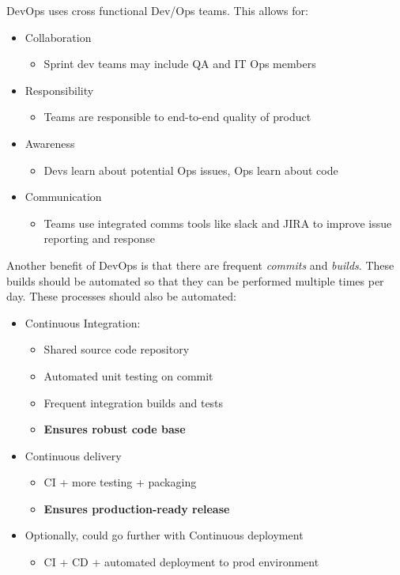 \documentclass[11pt,a4paper,titlepage,dvipsnames,cmyk]{scrartcl}
\begin{document}
DevOps uses cross functional Dev/Ops teams. This allows for:
\begin{itemize}
    \item Collaboration
    \begin{itemize}
        \item Sprint dev teams may include QA and IT Ops members
    \end{itemize}
    \item Responsibility
    \begin{itemize}
        \item Teams are responsible to end-to-end quality of product
    \end{itemize}
    \item Awareness
    \begin{itemize}
        \item Devs learn about potential Ops issues, Ops learn about code
    \end{itemize}
    \item Communication
    \begin{itemize}
        \item Teams use integrated comms tools like slack and JIRA to improve issue reporting and response
    \end{itemize}
\end{itemize}

Another benefit of DevOps is that there are frequent \textit{commits} and \textit{builds}. These builds should be automated so that they can be performed multiple times per day. These processes should also be automated:
\begin{itemize}
    \item Continuous Integration:
    \begin{itemize}
        \item Shared source code repository
        \item Automated unit testing on commit
        \item Frequent integration builds and tests
        \item \textbf{Ensures robust code base}
    \end{itemize}
    \item Continuous delivery
    \begin{itemize}
        \item CI + more testing + packaging
        \item \textbf{Ensures production-ready release}
    \end{itemize}
    \item Optionally, could go further with Continuous deployment
    \begin{itemize}
        \item CI + CD + automated deployment to prod environment
    \end{itemize}
\end{itemize}
\end{document}
